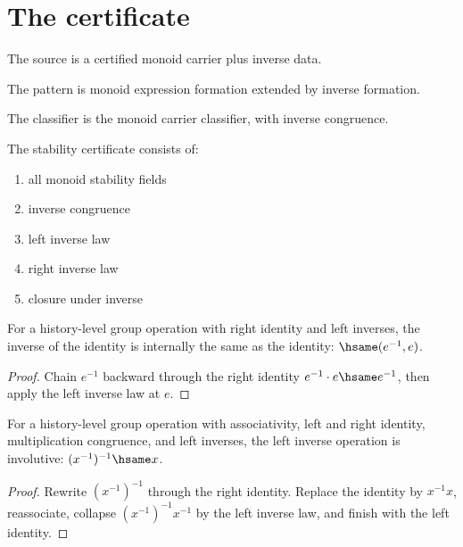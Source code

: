 \section{The certificate}

\begin{definition}
\label{def:group-source-specification}
The source is a certified monoid carrier plus inverse data.
\end{definition}

\begin{definition}
\label{def:group-pattern-specification}
The pattern is monoid expression formation extended by inverse formation.
\end{definition}

\begin{definition}
\label{def:group-classifier-specification}
The classifier is the monoid carrier classifier, with inverse congruence.
\end{definition}

\begin{definition}
\label{def:group-stability-certificate}
The stability certificate consists of:
\begin{enumerate}
  \item all monoid stability fields
  \item inverse congruence
  \item left inverse law
  \item right inverse law
  \item closure under inverse
\end{enumerate}
\end{definition}

\begin{theorem}
\label{thm:group-inverse-identity}
For a history-level group operation with right identity and left inverses, the
inverse of the identity is internally the same as the identity:
\(\hsame(e^{-1},e)\).
\end{theorem}
\begin{proof}
Chain \(e^{-1}\) backward through the right identity
\(e^{-1}\cdot e\hsame e^{-1}\), then apply the left inverse law at \(e\).
\end{proof}

\begin{theorem}
\label{thm:group-left-inverse-involutive}
For a history-level group operation with associativity, left and right
identity, multiplication congruence, and left inverses, the left inverse
operation is involutive: \((x^{-1})^{-1}\hsame x\).
\end{theorem}
\begin{proof}
Rewrite \((x^{-1})^{-1}\) through the right identity. Replace the identity
by \(x^{-1}x\), reassociate, collapse
\((x^{-1})^{-1}x^{-1}\) by the left inverse law, and finish with the left
identity.
\end{proof}

